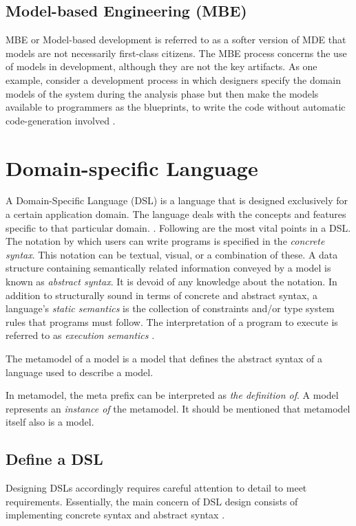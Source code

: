 \subsection{Model-based Engineering (MBE)}
MBE or Model-based development is referred to as a softer version of MDE that models are not necessarily first-class citizens. The MBE process concerns the use of models in development, although they are not the key artifacts. As one example, consider a development process in which designers specify the domain models of the system during the analysis phase but then make the models available to programmers as the blueprints, to write the code without automatic code-generation involved \cite{mdse}.


\section{Domain-specific Language}
A Domain-Specific Language (DSL) is a language that is designed exclusively for a certain application domain. The language deals with the concepts and features specific to that particular domain. \cite{dsl}.
Following are the most vital points in a DSL. The notation by which users can write programs is specified in the \textit{concrete syntax}. This notation can be textual, visual, or a combination of these. A data structure containing semantically related information conveyed by a model is known as \textit{abstract syntax}. It is devoid of any knowledge about the notation. In addition to structurally sound in terms of concrete and abstract syntax, a language's \textit{static semantics} is the collection of constraints and/or type system rules that programs must follow. The interpretation of a program to execute is referred to as \textit{execution semantics} \cite{dsl-eng}.

\begin{definition}
The metamodel of a model is a model that defines the abstract syntax of a language used to describe a model. 
\end{definition}

In metamodel, the meta prefix can be interpreted as \textit{the definition of}. A model represents an \textit{instance of} the metamodel. It should be mentioned that metamodel itself also is a model.

\subsection{Define a DSL}
Designing DSLs accordingly requires careful attention to detail to meet requirements. Essentially, the main concern of DSL design consists of implementing concrete syntax and abstract syntax \cite{engineering_modeling_languages}.
 
